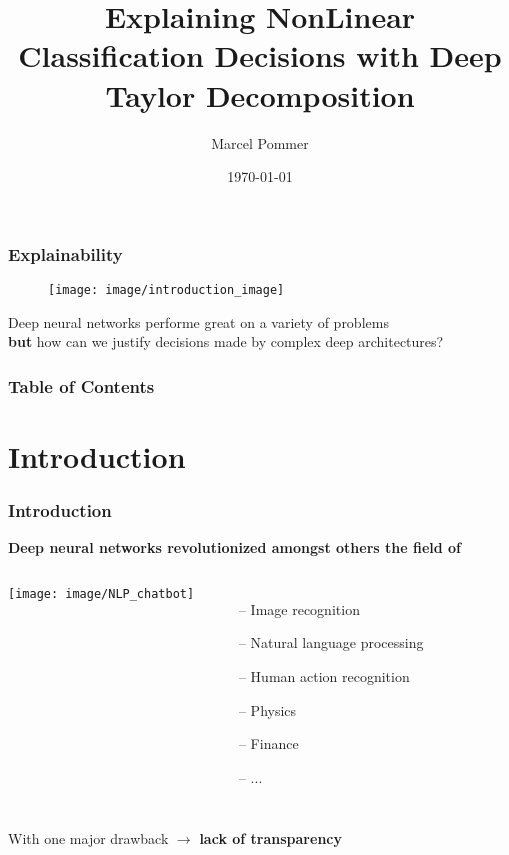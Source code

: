 \documentclass{beamer}
\begin{document}
\title[Deep Taylor Decomposition]{Explaining NonLinear Classification Decisions with Deep Taylor Decomposition}  
\author{Marcel Pommer}
\date{\today} 

\begin{frame}
\titlepage
\end{frame} 

\begin{frame}
\frametitle[Explainability]{Explainability}
\vspace{0.25cm}
\begin{figure}
\texttt{[image: image/introduction\_image]}
\end{figure}
\vspace{0.25cm}
Deep neural networks performe great on a variety of problems \nocite{*}\\
\textbf{but} how can we justify decisions made by complex deep architectures?\cite{Montavon.2017b}\\
\end{frame} 


\begin{frame}
\frametitle[Table of Contents]{Table of Contents}
\vspace{0.4cm}
\tableofcontents
\end{frame} 



\section[Introduction]{Introduction}
\begin{frame}
\frametitle{Introduction} 
\textbf{Deep neural networks revolutionized amongst others the field of}\\
\vspace{0.25cm}
       \begin{columns}[T]
             \centering
             \texttt{[image: image/NLP\_chatbot]}
			\begin{itemize}
			\item[--] Image recognition
			\item[--] Natural language processing
			\item[--] Human action recognition
			\item[--] Physics
			\item[--] Finance
			\item[--] ...
			\end{itemize}
         \end{columns} 
\vspace{0.5cm}
With one major drawback $\rightarrow$ \textbf{lack of transparency}
\end{frame}
\end{document}
